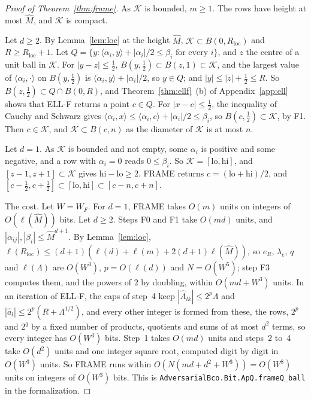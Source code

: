 \documentclass[11pt]{amsart}
\theoremstyle{definition}
\numberwithin{equation}{section}
\newcommand{\cK}{\mathcal{K}}
\newcommand{\ip}[1]{\langle #1\rangle}
\begin{document}
\begin{proof}[Proof of Theorem~\ref{thm:frame}]
As $\cK$ is bounded, $m\ge1$. The rows have height at most $\hat M$, and $\cK$ is compact.

Let $d\ge2$. By Lemma~\ref{lem:loc} at the height $\hat M$, $\cK\subset B(0,R_{\mathrm{loc}})$ and $R\ge R_{\mathrm{loc}}+1$. Let $Q=\{y:\ip{\alpha_i,y}+|\alpha_i|/2\le\beta_i\text{ for every }i\}$, and $z$ the centre of a unit ball in $\cK$. For $|y-z|\le\frac12$, $B(y,\frac12)\subset B(z,1)\subset\cK$, and the largest value of $\ip{\alpha_i,\cdot}$ on $B(y,\frac12)$ is $\ip{\alpha_i,y}+|\alpha_i|/2$, so $y\in Q$; and $|y|\le|z|+\frac12\le R$. So $B(z,\frac12)\subset Q\cap B(0,R)$, and Theorem~\ref{thm:ellf}~(b) of Appendix~\ref{app:ell} shows that ELL-F returns a point $c\in Q$. For $|x-c|\le\frac12$, the inequality of Cauchy and Schwarz gives $\ip{\alpha_i,x}\le\ip{\alpha_i,c}+|\alpha_i|/2\le\beta_i$, so $B(c,\frac12)\subset\cK$, by F1. Then $c\in\cK$, and $\cK\subset B(c,n)$ as the diameter of $\cK$ is at most $n$.

Let $d=1$. As $\cK$ is bounded and not empty, some $\alpha_i$ is positive and some negative, and a row with $\alpha_i=0$ reads $0\le\beta_i$. So $\cK=[\mathrm{lo},\mathrm{hi}]$, and $[z-1,z+1]\subset\cK$ gives $\mathrm{hi}-\mathrm{lo}\ge2$. FRAME returns $c=(\mathrm{lo}+\mathrm{hi})/2$, and $[c-\frac12,c+\frac12]\subset[\mathrm{lo},\mathrm{hi}]\subset[c-n,c+n]$.

The cost. Let $W=W_F$. For $d=1$, FRAME takes $O(m)$ units on integers of $O(\ell(\hat M))$ bits. Let $d\ge2$. Steps F0 and F1 take $O(md)$ units, and $|\alpha_{ij}|,|\beta_i|\le\hat M^{d+1}$. By Lemma~\ref{lem:loc}, $\ell(R_{\mathrm{loc}})\le(d+1)(\ell(d)+\ell(m)+2(d+1)\ell(\hat M))$, so $e_R$, $\lambda_e$, $q$ and $\ell(\Lambda)$ are $O(W^3)$, $p=O(\ell(d))$ and $N=O(W^5)$; step F3 computes them, and the powers of $2$ by doubling, within $O(md+W^3)$ units. In an iteration of ELL-F, the caps of step~4 keep $|\hat A_{lk}|\le2^p\Lambda$ and $|\hat a_l|\le2^p(R+\Lambda^{1/2})$, and every other integer is formed from these, the rows, $2^p$ and $2^q$ by a fixed number of products, quotients and sums of at most $d^2$ terms, so every integer has $O(W^3)$ bits. Step~1 takes $O(md)$ units and steps~2 to~4 take $O(d^2)$ units and one integer square root, computed digit by digit in $O(W^3)$ units. So FRAME runs within $O(N(md+d^2+W^3))=O(W^8)$ units on integers of $O(W^3)$ bits.
This is \texttt{AdversarialBco.Bit.ApQ.frameQ\_ball} in the formalization.
\end{proof}
\end{document}
